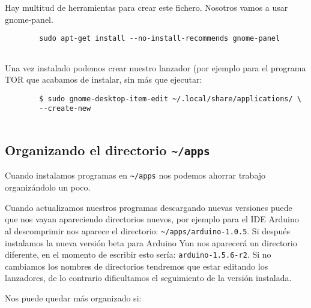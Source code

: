 Hay multitud de herramientas para crear este fichero. Nosotros vamos a
usar gnome-panel.

\begin{verbatim}
        sudo apt-get install --no-install-recommends gnome-panel
      
\end{verbatim}

Una vez instalado podemos crear nuestro lanzador (por ejemplo para el
programa TOR que acabamos de instalar, sin más que ejecutar:

\begin{verbatim}
        $ sudo gnome-desktop-item-edit ~/.local/share/applications/ \
        --create-new
      
\end{verbatim}

\subsection{\texorpdfstring{Organizando el directorio
\texttt{\textasciitilde{}/apps}}{Organizando el directorio \textasciitilde{}/apps}}\label{organizando-el-directorio-apps}

Cuando instalamos programas en \texttt{\textasciitilde{}/apps} nos
podemos ahorrar trabajo organizándolo un poco.

Cuando actualizamos nuestros programas descargando nuevas versiones
puede que nos vayan apareciendo directorios nuevos, por ejemplo para el
IDE Arduino al descomprimir nos aparece el directorio:
\texttt{\textasciitilde{}/apps/arduino-1.0.5}. Si después instalamos la
nueva versión beta para Arduino Yun nos aparecerá un directorio
diferente, en el momento de escribir esto sería:
\texttt{arduino-1.5.6-r2}. Si no cambiamos los nombres de directorios
tendremos que estar editando los lanzadores, de lo contrario
dificultamos el seguimiento de la versión instalada.

Nos puede quedar más organizado si:

